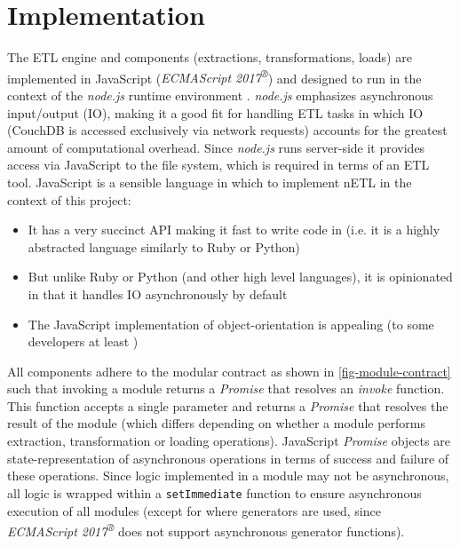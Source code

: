 \section{Implementation}
The ETL engine and components (extractions, transformations, loads) are implemented in JavaScript (\textit{ECMAScript 2017\textsuperscript{®}}) \cite{ecmascript2017} and designed to run in the context of the \textit{node.js} runtime environment \cite{nodejs}. \textit{node.js} emphasizes asynchronous input/output (IO), making it a good fit for handling ETL tasks in which IO (CouchDB is accessed exclusively via network requests) accounts for the greatest amount of computational overhead. Since \textit{node.js} runs server-side it provides access via JavaScript to the file system, which is required in terms of an ETL tool. JavaScript is a sensible language in which to implement nETL in the context of this project:

\begin{itemize}
    \item It has a very succinct API making it fast to write code in (i.e. it is a highly abstracted language similarly to Ruby or Python)
    \item But unlike Ruby or Python (and other high level languages), it is opinionated in that it handles IO asynchronously by default
    \item The JavaScript implementation of object-orientation is appealing (to some developers at least \cite{jsBook})
\end{itemize}

All components adhere to the modular contract as shown in \ref{fig-module-contract} such that invoking a module returns a \textit{Promise} \cite{jsPromises} that resolves an \textit{invoke} function. This function accepts a single parameter and returns a \textit{Promise} that resolves the result of the module (which differs depending on whether a module performs extraction, transformation or loading operations). JavaScript \textit{Promise} objects are state-representation of asynchronous operations in terms of success and failure of these operations. Since logic implemented in a module may not be asynchronous, all logic is wrapped within a \texttt{setImmediate} function to ensure asynchronous execution of all modules (except for where generators are used, since \textit{ECMAScript 2017\textsuperscript{®}} does not support asynchronous generator functions).



